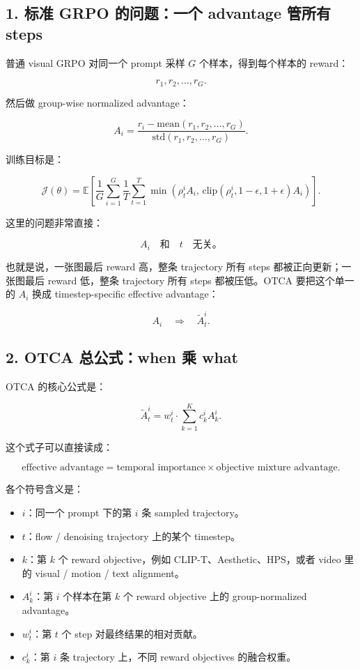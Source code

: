 \subsection{1. 标准 GRPO 的问题：一个 advantage 管所有 steps}

普通 visual GRPO 对同一个 prompt 采样 \(G\) 个样本，得到每个样本的 reward：

\[
r_1,r_2,\ldots,r_G .
\]

然后做 group-wise normalized advantage：

\[
A_i
=
\frac{
r_i-\mathrm{mean}(r_1,r_2,\ldots,r_G)
}{
\mathrm{std}(r_1,r_2,\ldots,r_G)
}.
\]

训练目标是：

\[
\mathcal{J}(\theta)
=
\mathbb{E}
\left[
\frac{1}{G}\sum_{i=1}^{G}
\frac{1}{T}\sum_{t=1}^{T}
\min
\left(
\rho_t^i A_i,\,
\mathrm{clip}(\rho_t^i,1-\epsilon,1+\epsilon)A_i
\right)
\right].
\]

这里的问题非常直接：

\[
A_i
\quad
\text{和}
\quad
t
\quad
\text{无关。}
\]

也就是说，一张图最后 reward 高，整条 trajectory 所有 steps 都被正向更新；一张图最后 reward 低，整条 trajectory 所有 steps 都被压低。OTCA 要把这个单一的 \(A_i\) 换成 timestep-specific effective advantage：

\[
A_i
\quad \Longrightarrow \quad
\tilde{A}_t^i .
\]

\subsection{2. OTCA 总公式：when 乘 what}

OTCA 的核心公式是：

\[
\tilde{A}_{t}^{i}
=
w_t^i
\cdot
\sum_{k=1}^{K} c_k^i A_k^i .
\]

这个式子可以直接读成：

\[
\text{effective advantage}
=
\text{temporal importance}
\times
\text{objective mixture advantage}.
\]

各个符号含义是：

\begin{itemize}[leftmargin=1.5em]
  \item \(i\)：同一个 prompt 下的第 \(i\) 条 sampled trajectory。
  \item \(t\)：flow / denoising trajectory 上的某个 timestep。
  \item \(k\)：第 \(k\) 个 reward objective，例如 CLIP-T、Aesthetic、HPS，或者 video 里的 visual / motion / text alignment。
  \item \(A_k^i\)：第 \(i\) 个样本在第 \(k\) 个 reward objective 上的 group-normalized advantage。
  \item \(w_t^i\)：第 \(t\) 个 step 对最终结果的相对贡献。
  \item \(c_k^i\)：第 \(i\) 条 trajectory 上，不同 reward objectives 的融合权重。
\end{itemize}

